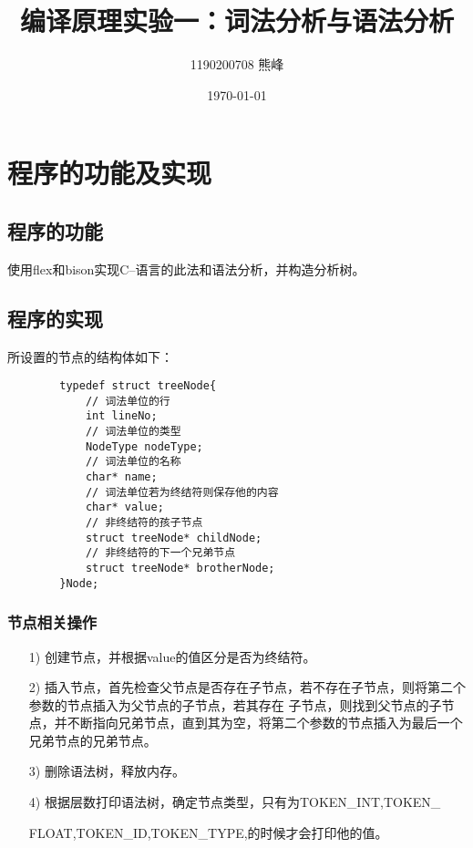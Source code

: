 \documentclass[UTF8]{ctexart}
\title{编译原理实验一：词法分析与语法分析}
\author{1190200708 熊峰}
\date{\today}
\begin{document}
 
\maketitle 

\section{程序的功能及实现} 
\subsection{程序的功能}
使用flex和bison实现C--语言的此法和语法分析，并构造分析树。\par
\subsection{程序的实现}

所设置的节点的结构体如下：\par
\lstset{language=C}
    \begin{lstlisting}
        typedef struct treeNode{
            // 词法单位的行
            int lineNo;
            // 词法单位的类型
            NodeType nodeType;
            // 词法单位的名称
            char* name;
            // 词法单位若为终结符则保存他的内容
            char* value;
            // 非终结符的孩子节点
            struct treeNode* childNode;
            // 非终结符的下一个兄弟节点
            struct treeNode* brotherNode;
        }Node;
    \end{lstlisting} 
\subsubsection{节点相关操作}
    \begin{itemize}
        \item [1)]
        创建节点，并根据value的值区分是否为终结符。\par
    
        \item [2)]
        插入节点，首先检查父节点是否存在子节点，若不存在子节点，则将第二个参数的节点插入为父节点的子节点，若其存在
        子节点，则找到父节点的子节点，并不断指向兄弟节点，直到其为空，将第二个参数的节点插入为最后一个兄弟节点的兄弟节点。\par
    
        \item [3)]
        删除语法树，释放内存。\par
        \item [4)]
        根据层数打印语法树，确定节点类型，只有为TOKEN\_INT,TOKEN\_\par
        FLOAT,TOKEN\_ID,TOKEN\_TYPE,的时候才会打印他的值。
    
    \end{itemize}
\end{document}
